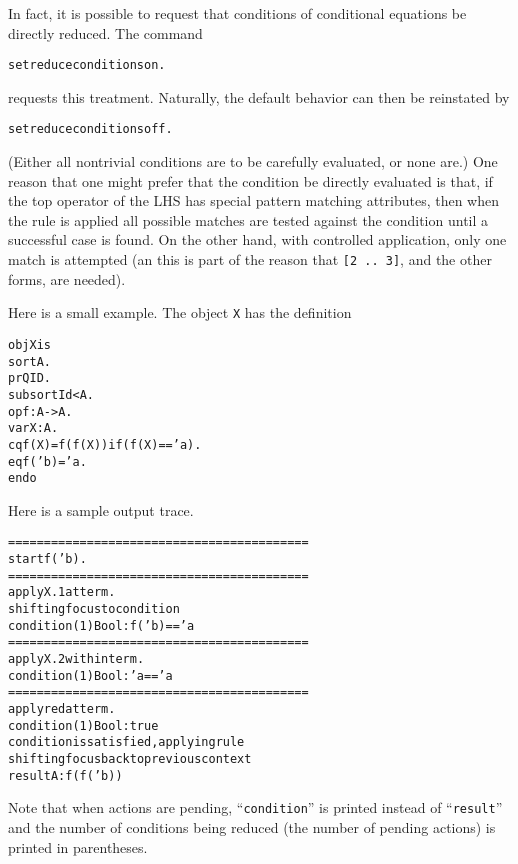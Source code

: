 In fact, it is possible to request that conditions of conditional
equations be directly reduced.  The command
\begin{alltt}
        set reduce conditions on .
\end{alltt}
requests this treatment.  Naturally, the default behavior can then be
reinstated by
\begin{alltt}
        set reduce conditions off .
\end{alltt}
(Either all nontrivial conditions are to be carefully evaluated, or
none are.)  One reason that one might prefer that the condition be
directly evaluated is that, if the top operator of the LHS has special
pattern matching attributes, then when the rule is applied all
possible matches are tested against the condition until a successful
case is found.  On the other hand, with controlled application, only
one match is attempted (an this is part of the reason that {\tt [2 ..
  3]}, and the other forms, are needed).

Here is a small example.  The object {\tt X} has the definition
\begin{alltt}
        obj X is
          sort A .
          pr QID .
          subsort Id < A .
          op f : A -> A .
          var X : A .
          cq f(X) = f(f(X)) if (f(X) == 'a) .
          eq f('b) = 'a .
        endo
\end{alltt}
Here is a sample output trace.
\begin{alltt}
        ==========================================
        start f ( 'b ) .
        ==========================================
        apply X.1 at term .
        shifting focus to condition
        condition(1) Bool: f('b) == 'a
        ==========================================
        apply X.2 within term .
        condition(1) Bool: 'a == 'a
        ==========================================
        apply red at term .
        condition(1) Bool: true
        condition is satisfied, applying rule
        shifting focus back to previous context
        result A: f(f('b))
\end{alltt}        
Note that when actions are pending, ``{\tt condition}'' is printed
instead of ``{\tt result}'' and the number of conditions being reduced
(the number of pending actions) is printed in parentheses.

